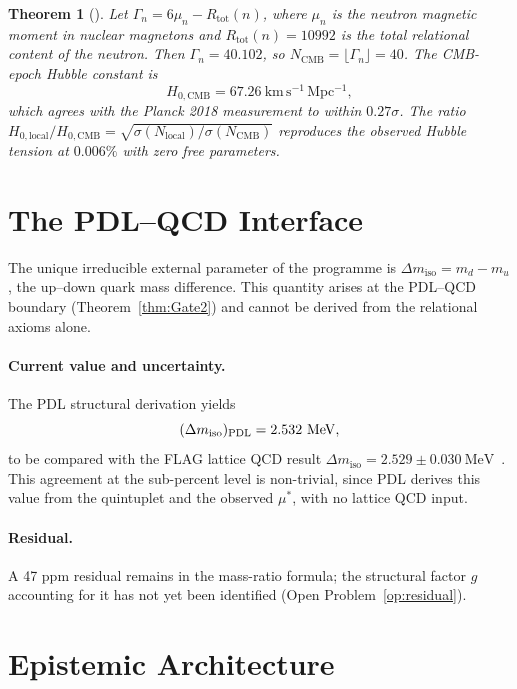 \documentclass[11pt,a4paper]{article}
\theoremstyle{plain}
\newtheorem{theorem}{Theorem}[section]
\theoremstyle{definition}
\theoremstyle{remark}
\newcommand{\PDL}{\textnormal{PDL}}
\newcommand{\Rtot}{R_{\mathrm{tot}}}
\newcommand{\mustar}{\mu^*}
\begin{document}
\begin{theorem}[\citep{D27,D35}]
\label{thm:hubble}
Let $\Gamma_n = 6\mu_n - \Rtot(n)$, where $\mu_n$ is the neutron magnetic moment in nuclear magnetons and $\Rtot(n)=10992$ is the total relational content of the neutron.
Then $\Gamma_n = 40.102$, so $N_{\mathrm{CMB}} = \lfloor\Gamma_n\rfloor = 40$.
The CMB-epoch Hubble constant is
\[
H_{0,\mathrm{CMB}} = 67.26~\mathrm{km\,s^{-1}\,Mpc^{-1}},
\]
which agrees with the Planck 2018 measurement to within $0.27\sigma$.
The ratio $H_{0,\mathrm{local}}/H_{0,\mathrm{CMB}} = \sqrt{\sigma(N_{\mathrm{local}})/\sigma(N_{\mathrm{CMB}})}$ reproduces the observed Hubble tension at $0.006\%$ with zero free parameters.
\end{theorem}

\section{The PDL--QCD Interface}
\label{sec:QCD}

The unique irreducible external parameter of the programme is $\Delta m_{\mathrm{iso}} = m_d - m_u$, the up--down quark mass difference.
This quantity arises at the PDL--QCD boundary (Theorem~\ref{thm:Gate2}) and cannot be derived from the relational axioms alone.

\paragraph{Current value and uncertainty.}
The PDL structural derivation yields
\[
(\Delta m_{\mathrm{iso}})_{\PDL} = 2.532~\mathrm{MeV},
\]
to be compared with the FLAG lattice QCD result $\Delta m_{\mathrm{iso}} = 2.529\pm 0.030~\mathrm{MeV}$~\citep{D30}.
This agreement at the sub-percent level is non-trivial, since PDL derives this value from the quintuplet and the observed $\mustar$, with no lattice QCD input.

\paragraph{Residual.}
A 47 ppm residual remains in the mass-ratio formula; the structural factor $g$ accounting for it has not yet been identified (Open Problem~\ref{op:residual}).

\section{Epistemic Architecture}
\label{sec:epistemic}
\end{document}
